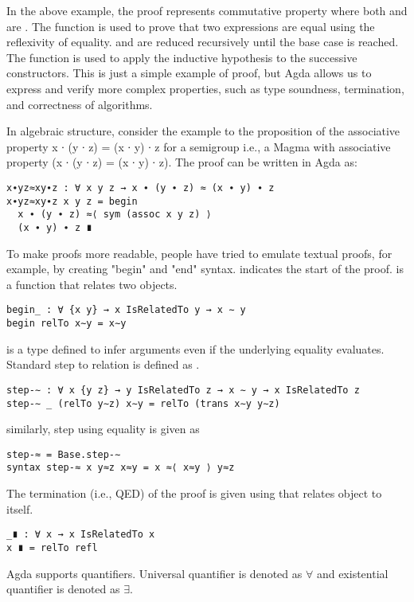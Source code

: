 In the above example, the proof  represents commutative
property where both  and  are . The
 function is used to prove that two expressions are equal using the
reflexivity of equality.  and  are
reduced recursively until the base case is reached. The  function
is used to apply the inductive hypothesis to the successive 
constructors. This is just a simple example of proof, but Agda allows us to
express and verify more complex properties, such as type soundness, termination,
and correctness of algorithms.

In algebraic structure, consider the example to the proposition of the
associative property x ∙ (y ∙ z) = (x ∙ y) ∙ z  for a semigroup i.e., a Magma
with associative property (x ∙ (y ∙ z) = (x ∙ y) ∙ z). The proof can be written
in Agda as:
\begin{verbatim}
x∙yz≈xy∙z : ∀ x y z → x ∙ (y ∙ z) ≈ (x ∙ y) ∙ z
x∙yz≈xy∙z x y z = begin 
  x ∙ (y ∙ z) ≈⟨ sym (assoc x y z) ⟩ 
  (x ∙ y) ∙ z ∎
\end{verbatim}
To make proofs more readable, people have tried to emulate textual proofs, for
example, by creating "begin" and "end" syntax.  indicates the start
of the proof.  is a function that relates two objects.
\begin{verbatim}
begin_ : ∀ {x y} → x IsRelatedTo y → x ∼ y
begin relTo x∼y = x∼y
\end{verbatim}
 is a type defined to infer arguments even if the underlying equality
evaluates. Standard step to relation is defined as .
\begin{verbatim}
step-∼ : ∀ x {y z} → y IsRelatedTo z → x ∼ y → x IsRelatedTo z
step-∼ _ (relTo y∼z) x∼y = relTo (trans x∼y y∼z)
\end{verbatim}
similarly, step using equality is given as
\begin{verbatim}
step-≈ = Base.step-∼
syntax step-≈ x y≈z x≈y = x ≈⟨ x≈y ⟩ y≈z
\end{verbatim}
The termination (i.e., QED) of the proof is given using  that relates object to itself.
\begin{verbatim}
_∎ : ∀ x → x IsRelatedTo x
x ∎ = relTo refl
\end{verbatim}
Agda supports quantifiers. Universal quantifier is denoted as \(\forall\) and
existential quantifier is denoted as \(\exists\).

